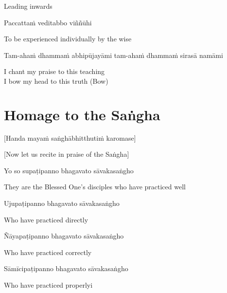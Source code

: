 \begin{cprenglish}
  Leading inwards
\end{cprenglish}

Paccattaṁ veditabbo viññūhi

\begin{cprenglish}
  To be experienced individually by the wise
\end{cprenglish}

Tam-ahaṁ dhammaṁ abhipūjayāmi tam-ahaṁ dhammaṁ sirasā namāmi

\begin{cprenglish}
  I chant my praise to this teaching\\
  I bow my head to this truth \hfill{(Bow)}
\end{cprenglish}

\section{Homage to the Saṅgha}
\label{homage-sangha}

\begin{center}
  [Handa mayaṁ saṅghābhitthutiṁ karomase]
\end{center}
\begin{center}
  [Now let us recite in praise of the Saṅgha]
\end{center}

Yo so supaṭipanno bhagavato sāvakasaṅgho

\begin{cprenglish}
  They are the Blessed One’s disciples who have practiced well
\end{cprenglish}

Ujupaṭipanno bhagavato sāvakasaṅgho

\begin{cprenglish}
  Who have practiced directly
\end{cprenglish}

Ñāyapaṭipanno bhagavato sāvakasaṅgho

\begin{cprenglish}
  Who have practiced correctly
\end{cprenglish}

Sāmīcipaṭipanno bhagavato sāvakasaṅgho

\begin{cprenglish}
  Who have practiced properlyi
\end{cprenglish}

